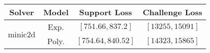 \begin{tabular}{cc|c|c} 
\hline 
 Solver & Model & Support Loss  & Challenge Loss \tabularnewline\hline 
\hline 
\multirow{2}{*}{minic2d} & Exp. & $\left[751.66,837.2\right]$ & $\left[13255,15091\right]$ \tabularnewline 
 & Poly. & $\left[754.64,840.52\right]$ & $\left[14323,15865\right]$ \tabularnewline 
\hline 
\end{tabular} 

